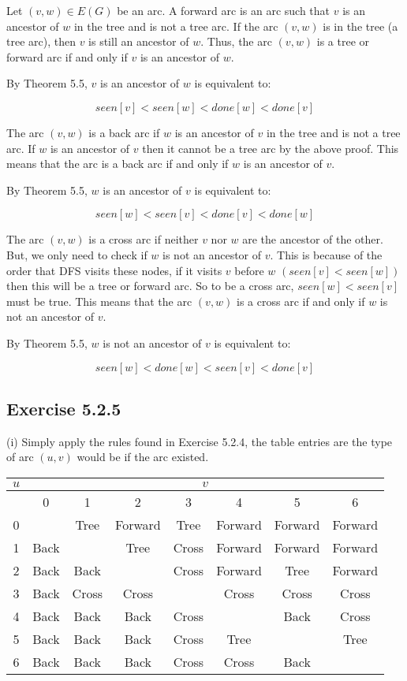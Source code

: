 \documentclass{article}
\begin{document}
Let \((v,w) \in E(G)\) be an arc. A forward arc is an arc such that \(v\) is an ancestor of \(w\) in the tree and is not a tree arc. If the arc \((v,w)\) is in the tree (a tree arc), then \(v\) is still an ancestor of \(w\). Thus, the arc \((v,w)\) is a tree or forward arc if and only if \(v\) is an ancestor of \(w\). 

By Theorem 5.5, \(v\) is an ancestor of \(w\) is equivalent to:

\[seen[v] < seen[w] < done[w] < done[v]\]

The arc \((v,w)\) is a back arc if \(w\) is an ancestor of \(v\) in the tree and is not a tree arc. If \(w\) is an ancestor of \(v\) then it cannot be a tree arc by the above proof. This means that the arc is a back arc if and only if \(w\) is an ancestor of \(v\).

By Theorem 5.5, \(w\) is an ancestor of \(v\) is equivalent to:

\[seen[w] < seen[v] < done[v] < done[w]\]

The arc \((v,w)\) is a cross arc if neither \(v\) nor \(w\) are the ancestor of the other. But, we only need to check if \(w\) is not an ancestor of \(v\). This is because of the order that DFS visits these nodes, if it visits \(v\) before \(w\) \((seen[v] < seen[w])\) then this will be a tree or forward arc. So to be a cross arc, \(seen[w] < seen[v]\) must be true. This means that the arc \((v,w)\) is a cross arc if and only if \(w\) is not an ancestor of \(v\).

By Theorem 5.5, \(w\) is not an ancestor of \(v\) is equivalent to:

\[seen[w] < done[w] < seen[v] < done[v]\]


\subsection*{Exercise 5.2.5}

(i) Simply apply the rules found in Exercise 5.2.4, the table entries are the type of arc \((u,v)\) would be if the arc existed.

\begin{tabular}{|c|c|c|c|c|c|c|c|}
\hline
\(u\)& \multicolumn{7}{|c|}{\(v\)} \\
\hline
& 0& 1& 2& 3& 4& 5& 6 \\
\hline
0& & Tree& Forward& Tree& Forward& Forward& Forward \\
\hline
1& Back& & Tree& Cross& Forward& Forward& Forward \\
\hline
2& Back& Back& & Cross& Forward& Tree& Forward \\
\hline
3& Back& Cross& Cross& & Cross& Cross& Cross \\
\hline
4& Back& Back& Back& Cross& & Back& Cross \\
\hline
5& Back& Back& Back& Cross& Tree& & Tree \\
\hline
6& Back& Back& Back& Cross& Cross& Back&  \\
\hline
\end{tabular}
\end{document}
